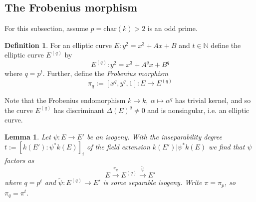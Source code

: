 \documentclass{scrartcl}
\newcommand{\N}{\mathbb{N}}
\newtheorem{lemma}[prop]{Lemma}
\theoremstyle{definition}
\newtheorem{definition}[prop]{Definition}
\begin{document}
\subsection{The Frobenius morphism}
For this subsection, assume $p = \mathrm{char}(k) > 2$ is an odd prime.
\begin{definition}
    For an elliptic curve $E: y^2 = x^3 + Ax + B$ and $t \in \N$ define the elliptic curve $E^{(q)}$ by
    \begin{equation*}
        E^{(q)}: y^2 = x^3 + A^q x + B^q
    \end{equation*}
    where $q = p^t$.
    Further, define the \emph{Frobenius morphism}
    \begin{equation*}
        \pi_q := [x^q, y^q, 1]: E \to E^{(q)}
    \end{equation*}
\end{definition}
Note that the Frobenius endomorphism $k \to k, \ \alpha \mapsto \alpha^q$ has trivial kernel, and so the curve $E^{(q)}$ has discriminant $\Delta(E)^q \neq 0$ and is nonsingular, i.e. an elliptic curve.
\begin{lemma}
    Let $\psi: E \to E'$ be an isogeny.
    With the inseparability degree $t := [k(E') : \psi^*k(E)]_i$ of the field extension $k(E') | \psi^*k(E)$ we find that $\psi$ factors as
    \begin{equation*}
        E \overset{\pi_q}{\longrightarrow} E^{(q)} \overset{\tilde{\psi}}{\longrightarrow} E'
    \end{equation*}
    where $q = p^t$ and $\tilde{\psi}: E^{(q)} \to E'$ is some separable isogeny.
    Write $\pi = \pi_p$, so $\pi_q = \pi^t$.
\end{lemma}
\end{document}
